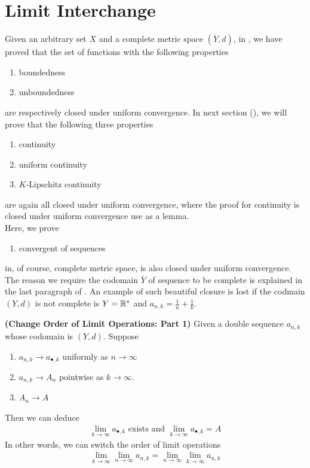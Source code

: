 \documentclass{report}
\begin{document}
\section{Limit Interchange}
\begin{mdframed}
Given an arbitrary set $X$ and  a complete metric space  $(\overline{Y},d)$, in , we have proved that the set of functions with the following properties 
\begin{enumerate}[label=(\alph*)]
  \item boundedness 
  \item unboundedness
\end{enumerate}
are respectively closed under uniform convergence. In next section (), we will prove that the following three properties 
\begin{enumerate}[label=(\alph*)]
  \item continuity
  \item uniform continuity
  \item $K$-Lipschitz continuity
\end{enumerate}
are again all closed under uniform convergence, where the proof for continuity is closed under uniform convergence use  as a lemma.\\

Here, we prove 
\begin{enumerate}[label=(\alph*)]
  \item convergent of sequences 
\end{enumerate}
in, of course, complete metric space, is also closed under uniform convergence.\\


The reason we require the codomain $\overline{Y}$ of sequence to be complete is explained in the last paragraph of . An example of such beautiful closure is lost if the codmain $(Y,d)$ is not complete is $Y=\mathbb{R}^*$ and  $a_{n,k}=\frac{1}{n}+\frac{1}{k}$. 
\end{mdframed}
\begin{theorem}
\label{COLO}
\textbf{(Change Order of Limit Operations: Part 1)} Given a double sequence $a_{n,k}$ whose codomain is $(Y,d)$. Suppose
\begin{enumerate}[label=(\alph*)]
  \item $a_{n,k}\to a_{\bullet,k}$ uniformly as $n\to \infty$ 
  \item $a_{n,k}\to A_n$ pointwise as  $k\to \infty$.
  \item $A_n \to A$ 
\end{enumerate}
Then we can deduce 
\begin{align*}
\lim_{k\to \infty}a_{\bullet,k}\text{ exists and }\lim_{k\to \infty}a_{\bullet,k}=A
\end{align*}
In other words, we can switch the order of limit operations
\begin{align*}
\lim_{k\to \infty}\lim_{n\to \infty}a_{n,k}=\lim_{n\to \infty}\lim_{k\to \infty}a_{n,k}
\end{align*}
\end{theorem}
\end{document}
